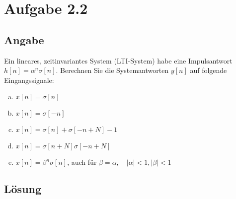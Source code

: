 \section*{Aufgabe 2.2}
\subsection*{Angabe}
	Ein lineares, zeitinvariantes System (LTI-System) habe eine Impulsantwort $h[n]=\alpha ^n \sigma [n]$. Berechnen Sie die Systemantworten $y[n]$ auf folgende Eingangssignale:
	\begin{enumerate}[a)]
		\item $x[n]=\sigma [n]$
		\item $x[n]=\sigma [-n]$
		\item $x[n]=\sigma [n]+\sigma [-n+N]-1$
		\item $x[n]=\sigma [n+N]\sigma [-n+N]$
		\item $x[n]=\beta ^n \sigma [n]$, auch für $\beta = \alpha, \quad |\alpha|<1, |\beta| < 1$
	\end{enumerate}
\subsection*{Lösung}
